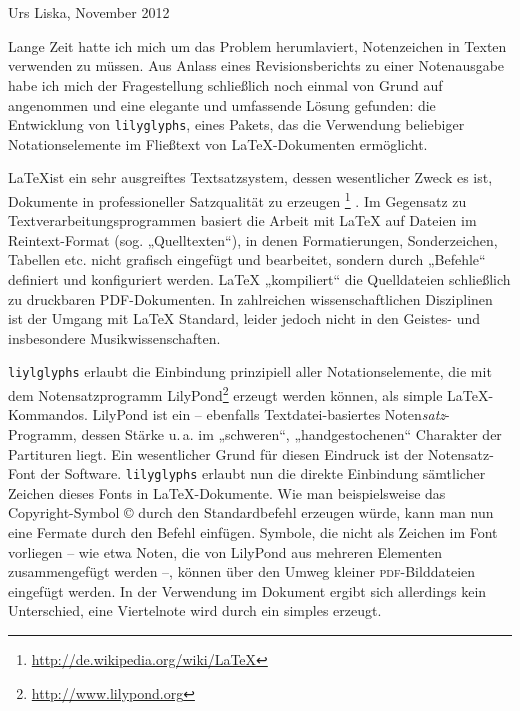 \documentclass[DIV=13]{scrartcl}
\begin{document}
\section*{\centering\Huge\lilyglyphs[scale=1.3]}
\begin{flushright}
Urs Liska, November 2012
\end{flushright}
Lange Zeit hatte ich mich um das Problem herumlaviert, Notenzeichen in Texten verwenden zu müssen.
Aus Anlass eines Revisionsberichts zu einer Notenausgabe habe ich mich der Fragestellung schließlich noch einmal von Grund auf angenommen und eine elegante und umfassende Lösung gefunden: 
die Entwicklung von \texttt{lilyglyphs}, eines Pakets, das die Verwendung beliebiger Notationselemente im Fließtext von \LaTeX-Dokumenten ermöglicht.

\LaTeX ist ein sehr ausgreiftes Textsatzsystem, dessen wesentlicher Zweck es ist, Dokumente in professioneller Satzqualität zu erzeugen
\footnote{\url{http://de.wikipedia.org/wiki/LaTeX}}%
.
Im Gegensatz zu Textverarbeitungsprogrammen basiert die Arbeit mit \LaTeX{} auf Dateien im Reintext-Format (sog. „Quelltexten“), in denen Formatierungen, Sonderzeichen, Tabellen etc. nicht grafisch eingefügt und bearbeitet, sondern durch „Befehle“ definiert und konfiguriert werden.
\LaTeX{} „kompiliert“ die Quelldateien schließlich zu druckbaren PDF-Dokumenten. 
In zahlreichen wissenschaftlichen Disziplinen ist der Umgang mit \LaTeX{} Standard, leider jedoch nicht in den Geistes- und insbesondere Musikwissenschaften.

\texttt{liylglyphs} erlaubt die Einbindung prinzipiell aller Notationselemente, die mit dem Notensatzprogramm LilyPond\footnote{\url{http://www.lilypond.org}} erzeugt werden können, als simple \LaTeX-Kommandos.
LilyPond ist ein -- ebenfalls Text\-datei-basiertes Noten\emph{satz}-Programm, dessen Stärke u.\,a. im „schweren“, „handgestochenen“ Charakter der Partituren liegt.
Ein wesentlicher Grund für diesen Eindruck ist der Notensatz-Font der Software.
\texttt{lilyglyphs} erlaubt nun die direkte Einbindung sämtlicher Zeichen dieses Fonts in \LaTeX-Doku\-mente.
Wie man beispielsweise das Copyright-Symbol \copyright{} durch den Standardbefehl  erzeugen würde, kann man nun eine Fermate \fermata durch den Befehl  einfügen.
Symbole, die nicht als Zeichen im Font vorliegen -- wie etwa Noten, die von LilyPond aus mehreren Elementen zusammengefügt werden --, können über den Umweg kleiner \textsc{pdf}-Bilddateien eingefügt werden.
In der Verwendung im Dokument ergibt sich allerdings kein Unterschied, eine Viertelnote \crotchet[scale=1.1] wird durch ein simples  erzeugt.
\end{document}
